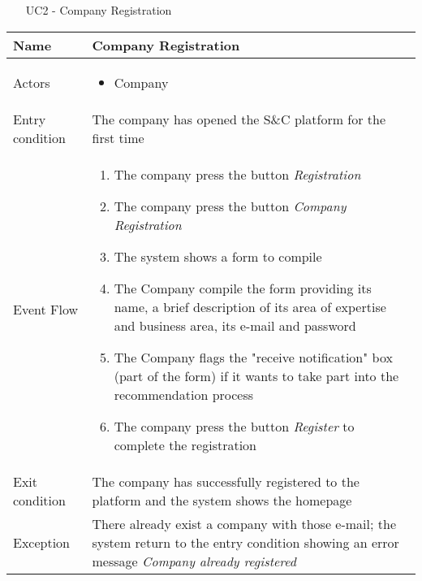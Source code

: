 			
		
			
			\begin{table} [H]
				\centering
					\begin{itemize}
					\item [UC2] - Company Registration
				\end{itemize}
				\begin{tabular}{|| P{7.5cm} | P{7.5cm} ||}
					\hline
					Name & Company Registration \\
					\hline
					Actors & \parbox{5cm}{\begin{itemize}
							\item Company
						\end{itemize}
					} \\
					\hline
					Entry condition & The company has opened the S\&C platform for the first time \\
					\hline
					Event Flow & \parbox{5cm}{\begin{enumerate}
							\item The company press the button \textit{Registration}
							\item The company press the button \textit{Company Registration}
							\item The system shows a form to compile
							\item The Company compile the form 
							providing its name, a brief description 
							of its area of expertise and business 
							area, its e-mail and password
							\item The Company flags the "receive 
							notification" box (part of the form) if it 
							wants to take part into the recommendation process
							\item The company press the button 
							\textit{Register} to complete the 
							registration
					\end{enumerate}} \\
					\hline 
					Exit condition & The company has successfully registered 
					to the platform and the system shows the 
					homepage \\
					\hline
					Exception & There already exist a company with 
					those e-mail; the system return to 
					the entry condition showing an 
					error message \textit{Company already 
						registered} \\
					\hline
				\end{tabular}
			\end{table}
			
		
			
